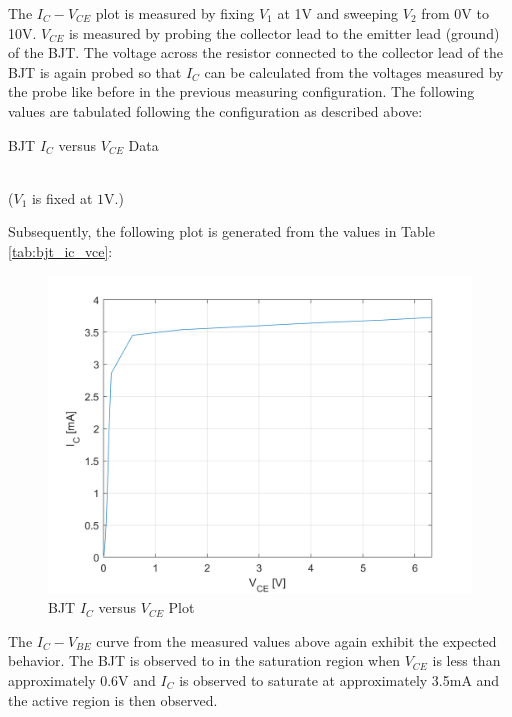 The $I_C - V_{CE}$ plot is measured by fixing $V_1$ at 1V and sweeping $V_2$ from 0V to 10V. $V_{CE}$ is measured by probing the collector lead to the emitter lead (ground) of the BJT. The voltage across the resistor connected to the collector lead of the BJT is again probed so that $I_C$ can be calculated from the voltages measured by the probe like before in the previous measuring configuration. The following values are tabulated following the configuration as described above:

\FloatBarrier

\begin{table}[h!]
	\centering
	\caption{BJT $I_C$ versus $V_{CE}$ Data}
	\label{tab:bjt_ic_vce}
	\\
	(\footnotesize $V_1$ is fixed at $1$\si{\volt}.)
\end{table}



\FloatBarrier

Subsequently, the following plot is generated from the values in Table \ref{tab:bjt_ic_vce}:

\FloatBarrier

\begin{figure}[h!]
	\centering
	\includegraphics[scale=0.4]{./images/bjt_ic_vce.PNG}
	\caption{BJT $I_C$ versus $V_{CE}$ Plot}
	\label{fig:bjt_ic_vce}
\end{figure}

\FloatBarrier

The $I_C - V_{BE}$ curve from the measured values above again exhibit the expected behavior. The BJT is observed to in the saturation region when $V_{CE}$ is less than approximately 0.6V and $I_C$ is observed to saturate at approximately 3.5mA and the active region is then observed. 
